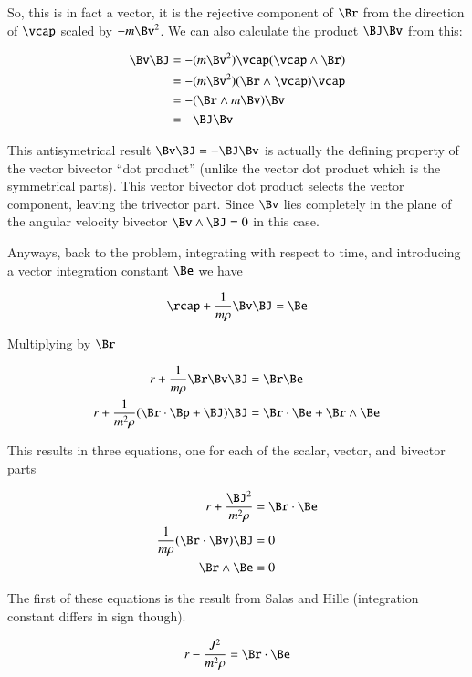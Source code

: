 So, this is in fact a vector, it is the rejective component of $\Br$ from
the direction of $\vcap$ scaled by $-m\Bv^2$.  We can also calculate
the product $\BJ \Bv$ from this:

\begin{align*}
\Bv \BJ 
        &= - (m \Bv^2) \vcap (\vcap \wedge \Br) \\
        &= - (m \Bv^2) (\Br \wedge \vcap) \vcap \\
        &= - (\Br \wedge m \Bv) \Bv \\
        &= - \BJ \Bv \\
\end{align*}

This antisymetrical result $\Bv \BJ = - \BJ \Bv$ is actually the defining 
property of the vector bivector ``dot product'' (unlike the vector dot product
which is the symmetrical parts).  This vector bivector dot product selects the
vector component, leaving the trivector part.  Since $\Bv$ lies completely in
the plane of the angular velocity bivector $\Bv \wedge \BJ = 0$ in this case.

Anyways, back to the problem, integrating 
with respect to time, and introducing a vector integration constant $\Be$
we have

\[
\rcap + \frac{1}{m \rho} \Bv \BJ = \Be
\]

Multiplying by $\Br$

\begin{align*}
r + \frac{1}{m \rho} \Br \Bv \BJ &= \Br \Be \\
r + \frac{1}{m^2 \rho} (\Br \cdot \Bp + \BJ) \BJ &= \Br \cdot \Be + \Br \wedge \Be \\
\end{align*}

This results in three equations, one for each of the scalar, vector, and bivector parts

\begin{align*}
r + \frac{\BJ^2}{m^2 \rho} &= \Br \cdot \Be \\
\frac{1}{m \rho} (\Br \cdot \Bv) \BJ &= 0 \\
\Br \wedge \Be &= 0 \\
\end{align*}

The first of these equations is the result from Salas and Hille (integration constant differs in sign though).

\begin{align*}
r - \frac{J^2}{m^2 \rho} &= \Br \cdot \Be \\
\end{align*}

